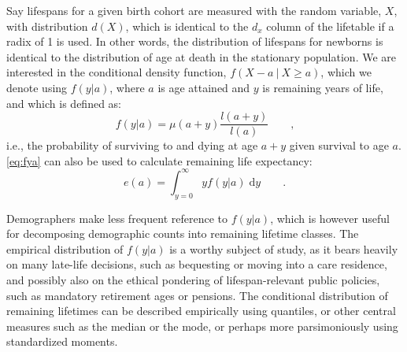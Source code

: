 \documentclass{article}
\newcommand{\dd}{\; \mathrm{d}}
\newcommand{\tc}{\quad\quad\text{,}}
\newcommand{\tp}{\quad\quad\text{.}}
\begin{document}
Say lifespans for a given birth cohort are measured with the random variable,
$X$, with distribution $d(X)$, which is identical to the $d_x$
column of the lifetable if a radix of 1 is used. In other words, the
distribution of lifespans for newborns is identical to the distribution of
age at death in the stationary population. We are interested in the
conditional density function, $f(X-a ~|~ X \ge a)$, which we denote using
$f(y|a)$, where $a$ is age attained and $y$ is remaining years of life, and
which is defined as:
\begin{equation}
\label{eq:fya}
f(y|a) = \mu(a+y) \frac{l(a+y)}{l(a)} \tc
\end{equation}
i.e., the probability of surviving to and dying at age $a+y$ given survival to
age $a$. \eqref{eq:fya} can also be used to calculate remaining life expectancy:
\begin{equation}
e(a) = \int _{y=0}^\infty y f(y|a) \dd y \tp
\end{equation}

Demographers make less frequent
reference to $f(y|a)$, which is however useful for decomposing
demographic counts into remaining lifetime classes. The empirical distribution
of $f(y|a)$ is a worthy subject of study, as it bears heavily on many late-life
decisions, such as bequesting or moving into a care residence, and possibly also
on the ethical pondering of lifespan-relevant public policies, such as mandatory
retirement ages or pensions. The conditional distribution of remaining lifetimes can be
described empirically using quantiles, or other central measures such as the
median or the mode, or perhaps more parsimoniously using standardized moments.
\end{document}
